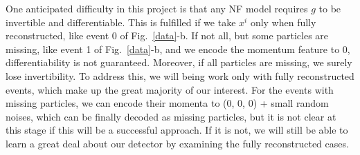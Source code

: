 \documentclass{article}
\begin{document}
One anticipated difficulty in this project is that any NF model requires $g$ to be invertible and differentiable. This is fulfilled if we take $x^i$ only when fully reconstructed, like event 0 of Fig.~\ref{data}-b. If not all, but some particles are missing, like event 1 of Fig.~\ref{data}-b, and we encode the momentum feature to 0, differentiability is not guaranteed. Moreover, if all particles are missing, we surely lose invertibility. To address this, we will being work only with fully reconstructed events, which make up the great majority of our interest.  For the events with missing particles, we can encode their momenta to (0, 0, 0) +  small random noises, which can be finally decoded as missing particles, but it is not clear at this stage if this will be a successful approach. If it is not, we will still be able to learn a great deal about our detector by examining the fully reconstructed cases.




\end{document}
